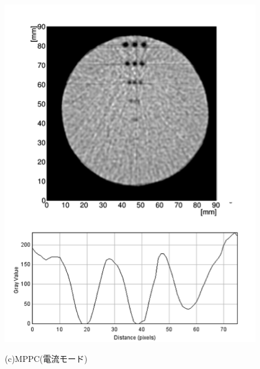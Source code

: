 \begin{figure}[H]
\begin{minipage}{0.5\hsize}
\begin{center}
     \includegraphics[bb=0.000000 0.000000 216.942066 292.295837,width=1.0\hsize]{image2/chapter5/spatial_MPPC_current.png}
  \end{center}
    \vspace{-0.3cm}\hspace{2.0cm}
   (c)MPPC(電流モード)
 \end{minipage}
 \begin{minipage}{0.5\hsize}
  \begin{center}

\end{center}
\end{minipage}
\end{figure}
